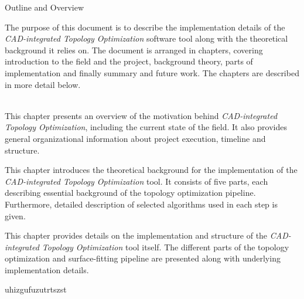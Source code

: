 \clearemptydoublepage

{}

\begin{center}
	\huge{Outline and Overview}
\end{center}




The purpose of this document is to describe the implementation details of the \emph{CAD-integrated Topology Optimization} software tool along with the theoretical background it relies on. The document is arranged in chapters, covering introduction to the field and the project, background theory, parts of implementation and finally summary and future work. The chapters are described in more detail below.
\\
\\
  \vspace{1mm}

\noindent  This chapter presents an overview of the motivation behind \emph{CAD-integrated Topology Optimization}, including the current state of the field. It also provides general organizational information about project execution, timeline and structure.
\\


  \vspace{1mm}

\noindent This chapter introduces the theoretical background for the implementation of the \emph{CAD-integrated Topology Optimization} tool. It consists of five parts, each describing essential background of the topology optimization pipeline. Furthermore, detailed description of selected algorithms used in each step is given.
\\

  \vspace{1mm}

\noindent This chapter provides details on the implementation and structure of the \emph{CAD-integrated Topology Optimization} tool itself. The different parts of the topology optimization and surface-fitting pipeline are presented along with underlying implementation details.
\\

  \vspace{1mm}

\noindent uhizgufuzutrtszst 
\\
